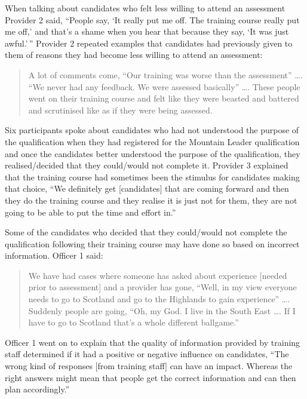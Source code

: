 \documentclass[
  12pt,
  a4paper,
]{book}
\begin{document}
When talking about candidates who felt less willing to attend an assessment Provider 2 said, ``People say, `It really put me off. The training course really put me off,' and that's a shame when you hear that because they say, `It was just awful.'\,'' Provider 2 repeated examples that candidates had previously given to them of reasons they had become less willing to attend an assessment:

\begin{quote}
A lot of comments come, ``Our training was worse than the assessment'' \ldots. ``We never had any feedback. We were assessed basically'' \ldots. These people went on their training course and felt like they were beasted and battered and scrutinised like as if they were being assessed.
\end{quote}

Six participants spoke about candidates who had not understood the purpose of the qualification when they had registered for the Mountain Leader qualification and once the candidates better understood the purpose of the qualification, they realised/decided that they could/would not complete it. Provider 3 explained that the training course had sometimes been the stimulus for candidates making that choice, ``We definitely get {[}candidates{]} that are coming forward and then they do the training course and they realise it is just not for them, they are not going to be able to put the time and effort in.''

Some of the candidates who decided that they could/would not complete the qualification following their training course may have done so based on incorrect information. Officer 1 said:

\begin{quote}
We have had cases where someone has asked about experience {[}needed prior to assessment{]} and a provider has gone, ``Well, in my view everyone needs to go to Scotland and go to the Highlands to gain experience'' \ldots. Suddenly people are going, ``Oh, my God. I live in the South East \ldots. If I have to go to Scotland that's a whole different ballgame.''
\end{quote}

Officer 1 went on to explain that the quality of information provided by training staff determined if it had a positive or negative influence on candidates, ``The wrong kind of responses {[}from training staff{]} can have an impact. Whereas the right answers might mean that people get the correct information and can then plan accordingly.''
\end{document}
